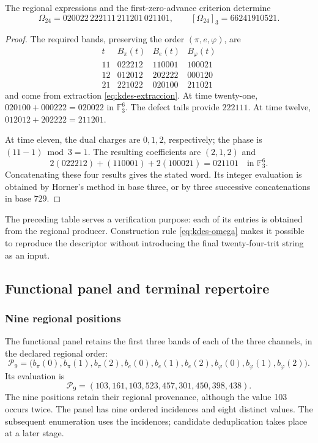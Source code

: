 \begin{proposition}
The regional expressions and the first-zero-advance criterion determine
\[
 \Omega_{24}=020022\,222111\,211201\,021101,
 \qquad [\Omega_{24}]_3=66241910521.
\]
\end{proposition}
\begin{proof}
The required bands, preserving the order $(\pi,e,\varphi)$, are
\[
 \begin{array}{c|ccc}
 t&B_\pi(t)&B_e(t)&B_\varphi(t)\\\hline
 11&022212&110001&100021\\
 12&012012&202222&000120\\
 21&221022&020100&211021
 \end{array}
\]
and come from extraction \eqref{eq:kdes-extraccion}. At time
twenty-one,
$020100+000222=020022$ in $\mathbb F_3^6$. The defect tails
provide $222111$. At time twelve,
$012012+202222=211201$.

At time eleven, the dual charges are $0,1,2$, respectively;
the phase is $(11-1)\bmod3=1$. The resulting coefficients are $(2,1,2)$ and
\[
 2(022212)+(110001)+2(100021)=021101
 \quad\text{in }\mathbb F_3^6.
\]
Concatenating these four results gives the stated word.
Its integer evaluation is obtained by Horner's method in base three, or by three
successive concatenations in base $729$.
\end{proof}

The preceding table serves a verification purpose: each of its
entries is obtained from the regional producer. Construction rule
\eqref{eq:kdes-omega} makes it possible to reproduce the descriptor without
introducing the final twenty-four-trit string as an input.

\subsection{Functional panel and terminal repertoire}

\subsubsection{Nine regional positions}

The functional panel retains the first three bands of each of the
three channels, in the declared regional order:
\begin{equation}
 \mathcal P_9=
 \bigl(b_\pi(0),b_\pi(1),b_\pi(2),
       b_e(0),b_e(1),b_e(2),
       b_\varphi(0),b_\varphi(1),b_\varphi(2)\bigr).
 \label{eq:kdes-panel}
\end{equation}
Its evaluation is
\[
 \mathcal P_9=(103,161,103,523,457,301,450,398,438).
\]
The nine positions retain their regional provenance, although the value
103 occurs twice. The panel has nine ordered incidences and
eight distinct values. The subsequent enumeration uses the incidences;
candidate deduplication takes place at a later stage.

